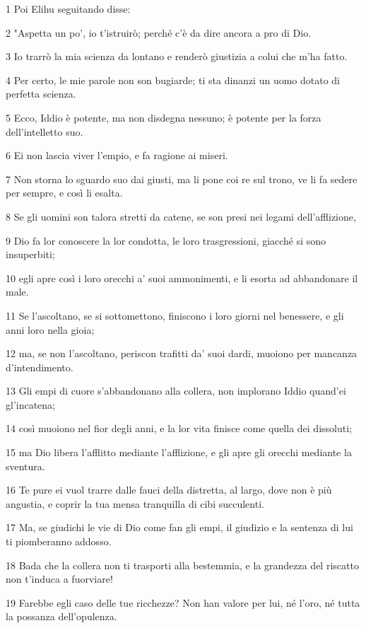 \par 1 Poi Elihu seguitando disse:
\par 2 "Aspetta un po', io t'istruirò; perché c'è da dire ancora a pro di Dio.
\par 3 Io trarrò la mia scienza da lontano e renderò giustizia a colui che m'ha fatto.
\par 4 Per certo, le mie parole non son bugiarde; ti sta dinanzi un uomo dotato di perfetta scienza.
\par 5 Ecco, Iddio è potente, ma non disdegna nessuno; è potente per la forza dell'intelletto suo.
\par 6 Ei non lascia viver l'empio, e fa ragione ai miseri.
\par 7 Non storna lo sguardo suo dai giusti, ma li pone coi re sul trono, ve li fa sedere per sempre, e così li esalta.
\par 8 Se gli uomini son talora stretti da catene, se son presi nei legami dell'afflizione,
\par 9 Dio fa lor conoscere la lor condotta, le loro trasgressioni, giacché si sono insuperbiti;
\par 10 egli apre così i loro orecchi a' suoi ammonimenti, e li esorta ad abbandonare il male.
\par 11 Se l'ascoltano, se si sottomettono, finiscono i loro giorni nel benessere, e gli anni loro nella gioia;
\par 12 ma, se non l'ascoltano, periscon trafitti da' suoi dardi, muoiono per mancanza d'intendimento.
\par 13 Gli empi di cuore s'abbandonano alla collera, non implorano Iddio quand'ei gl'incatena;
\par 14 così muoiono nel fior degli anni, e la lor vita finisce come quella dei dissoluti;
\par 15 ma Dio libera l'afflitto mediante l'afflizione, e gli apre gli orecchi mediante la sventura.
\par 16 Te pure ei vuol trarre dalle fauci della distretta, al largo, dove non è più angustia, e coprir la tua mensa tranquilla di cibi succulenti.
\par 17 Ma, se giudichi le vie di Dio come fan gli empi, il giudizio e la sentenza di lui ti piomberanno addosso.
\par 18 Bada che la collera non ti trasporti alla bestemmia, e la grandezza del riscatto non t'induca a fuorviare!
\par 19 Farebbe egli caso delle tue ricchezze? Non han valore per lui, né l'oro, né tutta la possanza dell'opulenza.
